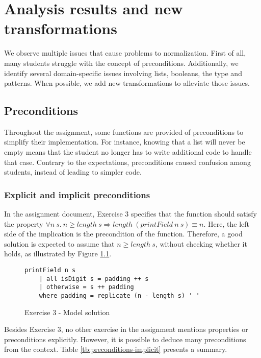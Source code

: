 \chapter{Analysis results and new transformations}
\label{sec:analysis-results}

We observe multiple issues that cause problems to normalization. First of all, many students struggle with the concept of preconditions. Additionally, we identify several domain-specific issues involving lists, booleans, the  type and patterns. When possible, we add new transformations to alleviate those issues.

\section{Preconditions}
\label{sec:analysis-preconditions}

Throughout the assignment, some functions are provided of preconditions to simplify their implementation. For instance, knowing that a list will never be empty means that the student no longer has to write additional code to handle that case. Contrary to the expectations, preconditions caused confusion among students, instead of leading to simpler code.

\subsection{Explicit and implicit preconditions}

In the assignment document, Exercise 3 specifies that the function  should satisfy the property $\forall n\ s.\ n \geq length\ s \Rightarrow length\ (printField\ n\ s) \equiv n$. Here, the left side of the implication is the precondition of the function. Therefore, a good solution is expected to assume that $n \geq length\ s$, without checking whether it holds, as illustrated by Figure \ref{fig:ex3-model-solution}.

\begin{figure}[H]
\centering
\begin{verbatim}
printField n s
    | all isDigit s = padding ++ s
    | otherwise = s ++ padding
    where padding = replicate (n - length s) ' '
\end{verbatim}
\caption{Exercise 3 - Model solution}
\label{fig:ex3-model-solution}
\end{figure}

Besides Exercise 3, no other exercise in the assignment mentions properties or preconditions explicitly. However, it is possible to deduce many preconditions from the context. Table \ref{tb:preconditions-implicit} presents a summary.


